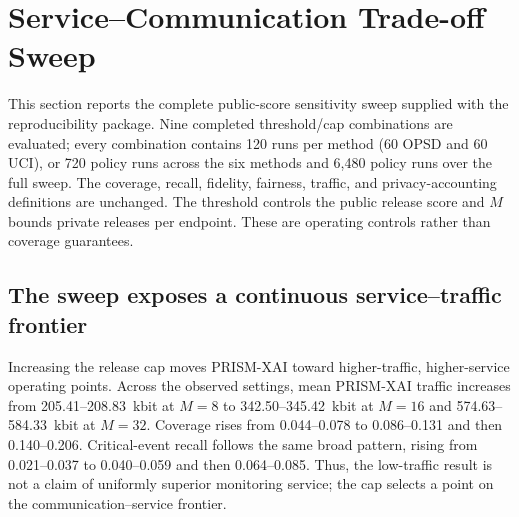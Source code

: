 \section{Service--Communication Trade-off Sweep}

\label{sec:service-sweep}

This section reports the complete public-score sensitivity sweep supplied with the reproducibility package. Nine completed threshold/cap combinations are evaluated; every combination contains 120 runs per method (60 OPSD and 60 UCI), or 720 policy runs across the six methods and 6,480 policy runs over the full sweep. The coverage, recall, fidelity, fairness, traffic, and privacy-accounting definitions are unchanged. The threshold controls the public release score and $M$ bounds private releases per endpoint. These are operating controls rather than coverage guarantees.

\subsection{The sweep exposes a continuous service--traffic frontier}

Increasing the release cap moves PRISM-XAI toward higher-traffic, higher-service operating points. Across the observed settings, mean PRISM-XAI traffic increases from 205.41--208.83~kbit at $M=8$ to 342.50--345.42~kbit at $M=16$ and 574.63--584.33~kbit at $M=32$. Coverage rises from 0.044--0.078 to 0.086--0.131 and then 0.140--0.206. Critical-event recall follows the same broad pattern, rising from 0.021--0.037 to 0.040--0.059 and then 0.064--0.085. Thus, the low-traffic result is not a claim of uniformly superior monitoring service; the cap selects a point on the communication--service frontier.

